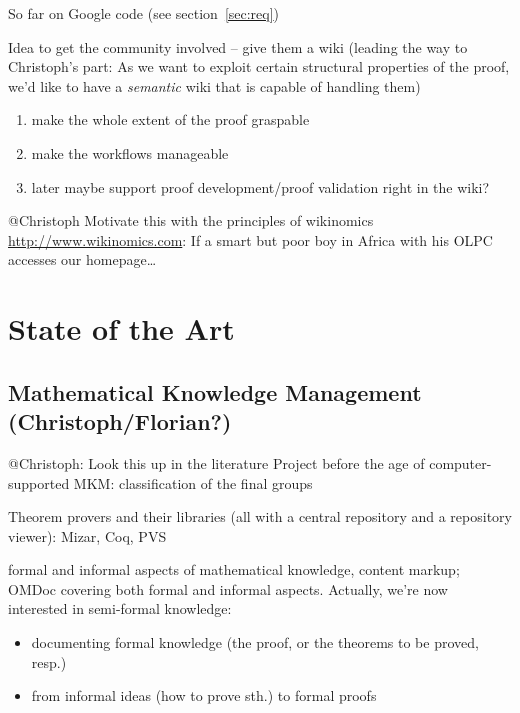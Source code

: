 \documentclass{llncs}
\begin{document}
So far on Google code (see section~\ref{sec:req})

Idea to get the community involved -- give them a wiki (leading the way to Christoph's
part: As we want to exploit certain structural properties of the proof, we'd like to have
a \emph{semantic} wiki that is capable of handling them)

\begin{enumerate}
\item make the whole extent of the proof graspable
\item make the workflows manageable
\item later maybe support proof development/proof validation right in the
  wiki?
\end{enumerate}

\begin{todo}{@Christoph}
  Motivate this with the principles of wikinomics \url{http://www.wikinomics.com}: If a
  smart but poor boy in Africa with his OLPC accesses our homepage\ldots
\end{todo}

\section{State of the Art}
\label{sec:sota}

\subsection{Mathematical Knowledge Management (Christoph/Florian?)}
\label{sec:mkm}

\begin{todo}{@Christoph: Look this up in the literature}
Project before the age of computer-supported MKM: classification of the final groups
\end{todo}

Theorem provers and their libraries (all with a central repository and a repository
viewer): Mizar, Coq, PVS

formal and informal aspects of mathematical knowledge, content markup; OMDoc covering both
formal and informal aspects.  Actually, we're now interested in semi-formal
knowledge:
\begin{itemize}
\item documenting formal knowledge (the proof, or the theorems to be proved, resp.)
\item from informal ideas (how to prove sth.) to formal proofs
\end{itemize}
\end{document}
